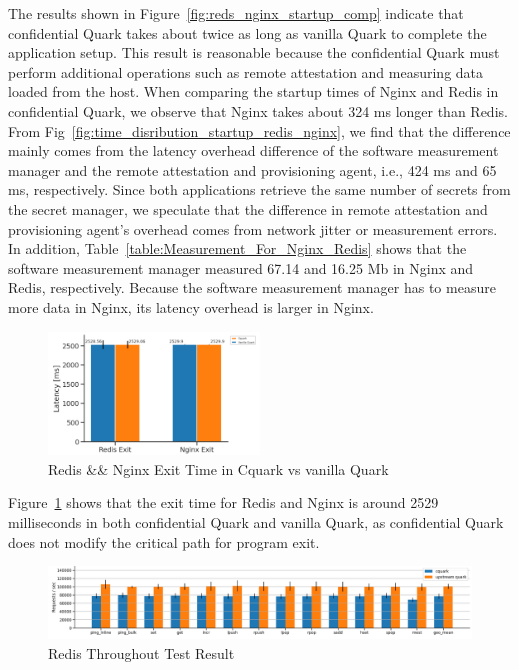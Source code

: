 The results shown in Figure~\ref{fig:reds_nginx_startup_comp} indicate that confidential Quark takes about twice as long as vanilla Quark to complete the application setup. This result is reasonable because the confidential Quark must perform additional operations such as remote attestation and 
measuring data loaded from the host. When comparing the startup times of Nginx and Redis in confidential Quark, we observe that Nginx takes about 324 ms longer than Redis. From Fig~\ref{fig:time_disribution_startup_redis_nginx}, we find that the difference mainly comes from the latency overhead 
difference of the software measurement manager and the remote attestation and provisioning agent, i.e., 424 ms and 65 ms, respectively. Since both applications retrieve the same number of secrets from the secret manager, we speculate that the difference in remote attestation and provisioning 
agent's overhead comes from network jitter or measurement errors. In addition, Table~\ref{table:Measurement_For_Nginx_Redis} shows that the software measurement manager measured 67.14 and 16.25 Mb in Nginx and Redis, respectively. Because the software measurement manager has to measure more data in 
Nginx, its latency overhead is larger in Nginx. 

\begin{figure}[!htb]
  \centering
  \includegraphics[width=0.5\textwidth]{images/reds_nginx_exit_comp.PNG}
  \caption[Redis \&\& Nginx Exit Time in Cquark vs vanilla Quark]{Redis \&\& Nginx Exit Time in Cquark vs vanilla Quark}
  \label{fig:reds_nginx_exit_comp}
\end{figure}
Figure~\ref{fig:reds_nginx_exit_comp} shows that the exit time for Redis and Nginx is around 2529 milliseconds in both confidential Quark and vanilla Quark, as confidential Quark does not modify the critical path for program exit.
\begin{figure}[!htb]
  \centering
  \includegraphics[width=1\textwidth]{images/redis_throughput.PNG}
  \caption[Redis Throughout Test]{Redis Throughout Test Result}
  \label{fig:redis_throughput}
\end{figure}


